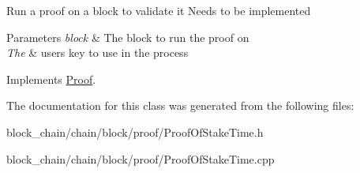 Run a proof on a block to validate it Needs to be implemented


\begin{DoxyParams}{Parameters}
{\em block} & The block to run the proof on \\
\hline
{\em The} & user\textquotesingle{}s key to use in the process \\
\hline
\end{DoxyParams}


Implements \mbox{\hyperlink{classProof_a6ab9f6c3f603447e3a9c7c932b5deac4}{Proof}}.



The documentation for this class was generated from the following files\+:\begin{DoxyCompactItemize}
\item 
block\+\_\+chain/chain/block/proof/Proof\+Of\+Stake\+Time.\+h\item 
block\+\_\+chain/chain/block/proof/Proof\+Of\+Stake\+Time.\+cpp\end{DoxyCompactItemize}
